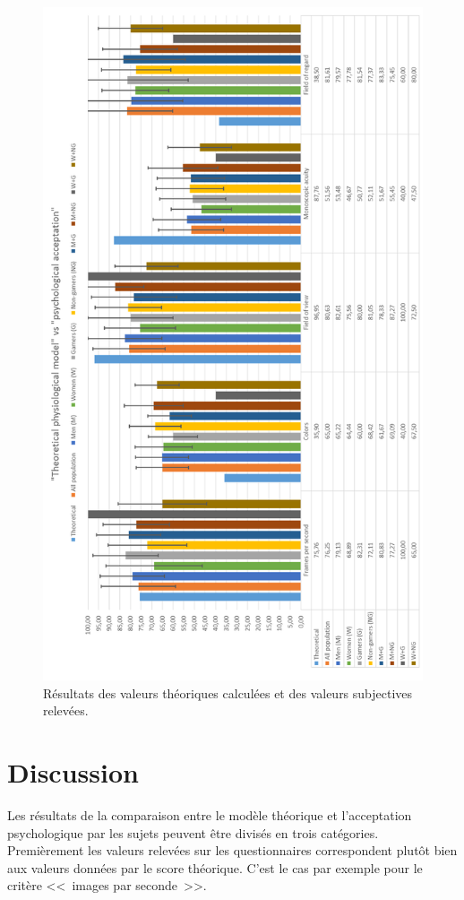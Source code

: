 	\begin{figure}
		\centering
		\includegraphics[scale=.75]{Figures/ResultsComparison}
		\caption{Résultats des valeurs théoriques calculées et des valeurs subjectives relevées.}
		\label{fig:results_comparison}
	\end{figure}
	
	\section{Discussion}
	\par Les résultats de la comparaison entre le modèle théorique et l'acceptation psychologique par les sujets peuvent être divisés en trois catégories. Premièrement les valeurs relevées sur les questionnaires correspondent plutôt bien aux valeurs données par le score théorique. C'est le cas par exemple pour le critère <<~images par seconde~>>.
	
